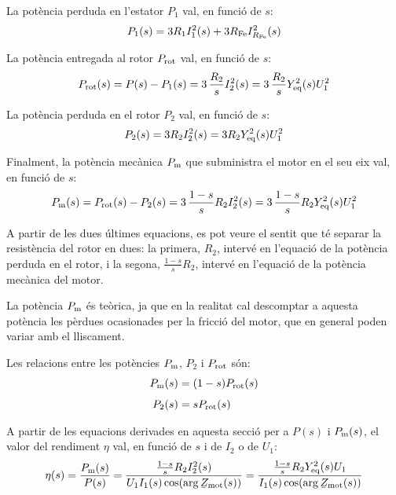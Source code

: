 La potència perduda en l'estator $P_1$ val, en funció de $s$:
\begin{equation}
    P_1(s)  =  3 R_1 I_1^2(s) + 3 R_\mathrm{Fe} I_{R_\mathrm{Fe}}^2(s)
\end{equation}

La potència entregada al rotor $P_\mathrm{rot}$  val, en funció de $s$:
\begin{equation}
    P_\mathrm{rot}(s)  =  P(s) - P_1(s) = 3 \,\frac{R_2}{s} I_2^2(s) = 3 \,\frac{R_2}{s} Y_\mathrm{eq}^2(s) U_1^2
\end{equation}

La potència perduda en el rotor $P_2$ val, en funció de $s$:
\begin{equation}
    P_2(s)  =  3 R_2 I_2^2(s) = 3 R_2 Y_\mathrm{eq}^2(s) U_1^2
\end{equation}

Finalment, la potència mecànica $P_\mathrm{m}$ que subministra el motor en el seu eix val, en funció de $s$:
\begin{equation}\index{motors d'inducció!potència mecànica}
    P\ped{m}(s)  =  P\ped{rot}(s) - P_2(s) = 3 \,\frac{1-s}{s} R_2 I_2^2(s) = 3 \,\frac{1-s}{s} R_2 Y\ped{eq}^2(s) U_1^2 \label{eq:Pm-I2-U1}
\end{equation}

A partir de les dues últimes equacions, es pot veure el sentit que té separar la resistència del rotor en dues: la primera, $R_2$,  intervé en l'equació de la potència perduda en el rotor, i la segona, $\frac{1-s}{s} R_2$,  intervé en l'equació de la potència mecànica del motor.

La potència $P_\mathrm{m}$  és teòrica, ja que en la realitat cal descomptar a aquesta potència les pèrdues ocasionades per la fricció del motor, que en general poden variar amb el lliscament.

Les relacions entre les potències   $P_\mathrm{m}$,  $P_2$ i $P_\mathrm{rot}$ són:
\begin{subequations}
\begin{align}
    P_\mathrm{m}(s) &=  (1-s) P_\mathrm{rot}(s) \label{eq:Pm-Prot} \\[1ex]
    P_2(s) &=   s P_\mathrm{rot}(s)
\end{align}
\end{subequations}

A partir de les equacions derivades en aquesta secció per a $P(s)$ i $P_\mathrm{m}(s)$, el valor del rendiment $\eta$ val, en funció de $s$ i de $I_2$ o de $U_1$:
\begin{equation}\index{motors d'inducció!rendiment}
	\eta(s) = \frac{P\ped{m}(s)}{P(s)} = \frac{\frac{1-s}{s} R_2 I_2^2(s)}{U_1 I_1(s) \cos(\arg\cmplx{Z}\ped{mot}(s))} =  \frac{\frac{1-s}{s} R_2 Y\ped{eq}^2(s) U_1}{I_1(s) \cos(\arg\cmplx{Z}\ped{mot}(s))} \label{eq:mot-rendim}
\end{equation}

